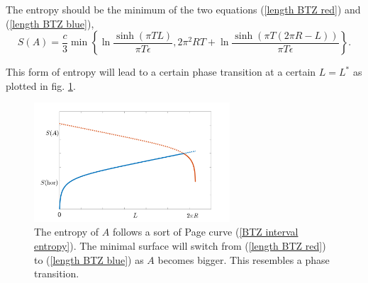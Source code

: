 The entropy should be the minimum of the two equations (\ref{length BTZ red}) and (\ref{length BTZ blue}),
\begin{equation}\label{BTZ interval entropy}
    S\left(A\right) = \frac{c}{3}\min\left\{\ln\frac{\sinh\left(\pi T L\right)}{\pi T\epsilon}, 2\pi^2 RT + \ln\frac{\sinh\left(\pi T \left(2\pi R-L\right)\right)}{\pi T\epsilon}\right\}.
\end{equation}

This form of entropy will lead to a certain phase transition at a certain $L=L^*$ as plotted in fig. \ref{BTZ entropy phase transition}.

\begin{figure}
    \centering
    \includegraphics[width=0.65\textwidth]{figures/pagecurveplot0.png}
    \caption{The entropy of $A$ follows a sort of Page curve (\ref{BTZ interval entropy}). The minimal surface will switch from (\ref{length BTZ red}) to (\ref{length BTZ blue}) as $A$ becomes bigger. This resembles a phase transition.}
    \label{BTZ entropy phase transition}
\end{figure}
